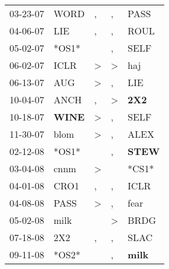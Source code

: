 \begin{supertabular}{p{0.07\textwidth}p{0.06\textwidth}p{0.02\textwidth}p{0.02\textwidth}p{0.06\textwidth}}
          03-23-07\textsuperscript{} &           WORD\textsuperscript{} &                , &             , &           PASS\textsuperscript{} \\
          04-06-07\textsuperscript{} &            LIE\textsuperscript{} &                , &             , &           ROUL\textsuperscript{} \\
          05-02-07\textsuperscript{} &                            *OS1* &                  &             , &           SELF\textsuperscript{} \\
          06-02-07\textsuperscript{} &           ICLR\textsuperscript{} &     \textgreater &  \textgreater &            haj\textsuperscript{} \\
          06-13-07\textsuperscript{} &            AUG\textsuperscript{} &     \textgreater &             , &            LIE\textsuperscript{} \\
          10-04-07\textsuperscript{} &           ANCH\textsuperscript{} &                , &  \textgreater &   \textbf{2X2\textsuperscript{}} \\
          10-18-07\textsuperscript{} &  \textbf{WINE\textsuperscript{}} &     \textgreater &             , &           SELF\textsuperscript{} \\
          11-30-07\textsuperscript{} &           blom\textsuperscript{} &     \textgreater &             , &           ALEX\textsuperscript{} \\
          02-12-08\textsuperscript{} &                            *OS1* &                  &             , &  \textbf{STEW\textsuperscript{}} \\
          03-04-08\textsuperscript{} &           cnnm\textsuperscript{} &     \textgreater &               &                            *CS1* \\
          04-01-08\textsuperscript{} &           CRO1\textsuperscript{} &                , &             , &           ICLR\textsuperscript{} \\
          04-08-08\textsuperscript{} &           PASS\textsuperscript{} &     \textgreater &             , &           fear\textsuperscript{} \\
          05-02-08\textsuperscript{} &           milk\textsuperscript{} &                  &  \textgreater &           BRDG\textsuperscript{} \\
          07-18-08\textsuperscript{} &            2X2\textsuperscript{} &                , &             , &           SLAC\textsuperscript{} \\
          09-11-08\textsuperscript{} &                            *OS2* &                  &             , &  \textbf{milk\textsuperscript{}} \\

\end{supertabular}
